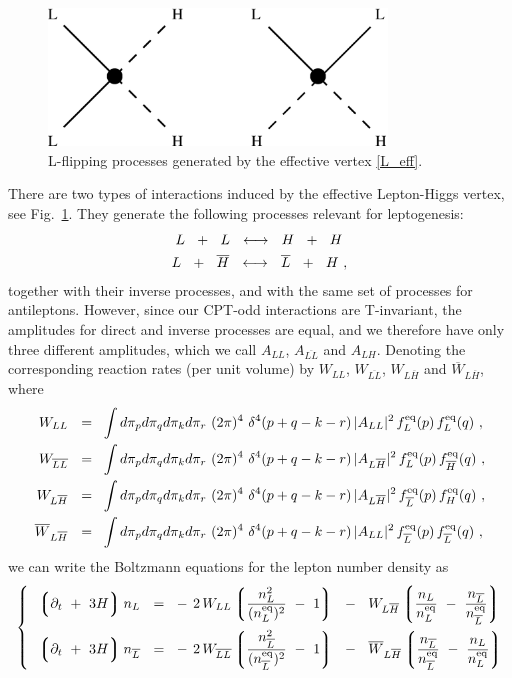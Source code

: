 \documentclass[12pt]{revtex4}
\newcommand{\eq}{{\rm eq}}
\newcommand{\lgr}{\left\lgroup}
\newcommand{\rgr}{\right\rgroup}
\newcommand{\p}{\partial}
\newcommand{\ov}{\overline}
\begin{document}
\begin{figure}
\includegraphics[width=9cm]{lflip.eps}
\caption{L-flipping processes generated by the effective vertex \eqref{L_eff}.}
\label{lflip_fig}
\end{figure}
There are two types of interactions induced by the effective
Lepton-Higgs vertex, see Fig.~\ref{lflip_fig}.
They generate the following processes relevant for leptogenesis:
\begin{align}
\notag
	L~~+~~L ~~\longleftrightarrow~~ H~~+~~H~  \\
\notag
	L~~+~~\ov{H} ~~\longleftrightarrow~~ \ov{L}~~+~~H~,
\end{align}
together with their inverse processes, and with the same set of processes
for antileptons.
However, since our CPT-odd interactions are T-invariant, the amplitudes for
direct and inverse processes are equal, and we therefore have 
only three different amplitudes, which we call  
$ A_{LL} $, $ A_{\ov{LL}} $ and $ A_{LH} $.
Denoting the corresponding reaction rates (per unit volume) by
$ W_{LL} $, $ W_{\ov{LL}} $, $ W_{L\ov{H}} $ and $ \ov{W}_{L\ov{H}} $,
where 
\begin{align*}
	W_{LL}   ~~=~~  &
		\int d\pi_p d\pi_q d\pi_k d\pi_r ~
		(2\pi)^4~ \delta^4 ( p + q - k - r )\,
		| A_{LL} |^2\, f_L^\eq(p)\, f_L^\eq(q)~, \\
	W_{\ov{LL}}   ~~=~~  &
		\int d\pi_p d\pi_q d\pi_k d\pi_r ~
		(2\pi)^4~ \delta^4 ( p + q - k - r )\,
		| A_{L\ov{H}} |^2\, f_L^\eq(p)\, f_{\ov{H}}^\eq(q)~, \\
	W_{L\ov{H}}  ~~=~~  &
		\int d\pi_p d\pi_q d\pi_k d\pi_r ~
		(2\pi)^4~ \delta^4 ( p + q - k - r )\,
		| A_{L\ov{H}} |^2\, f_{\ov{L}}^\eq(p)\, f_H^\eq(q)~, \\
	\ov{W}_{L\ov{H}}  ~~=~~  &
		\int d\pi_p d\pi_q d\pi_k d\pi_r ~
		(2\pi)^4~ \delta^4 ( p + q - k - r )\,
		| A_{LL} |^2\, f_{\ov{L}}^\eq(p)\, f_{\ov{L}}^\eq(q)~,
\end{align*}
	we can write the Boltzmann equations for the lepton number density
	as
\begin{equation}
\label{lepton_sys}
\left\{~~
\begin{split}
	\lgr \p_t ~+~ 3H \rgr 
		n_L ~~=~~ &
	-\, 2\, W_{LL} \lgr \frac{n_L^2}{(n_L^\eq)^2} ~-~ 1 \rgr
	~~-~~
	W_{L\ov{H}} \lgr \frac{n_L}{n_L^\eq} ~-~ 
			\frac{n_{\ov{L}}}{n_{\ov{L}}^\eq} \rgr  \\
	\lgr \p_t ~+~ 3H \rgr 
		n_{\ov{L}} ~~=~~ &
	-\, 2\, W_{\ov{LL}} \lgr 
		\frac{n_{\ov{L}}^2}{(n_{\ov{L}}^\eq)^2} ~-~ 1 \rgr
	~~-~~
	\ov{W}_{L\ov{H}} \lgr \frac{n_{\ov{L}}}{n_{\ov{L}}^\eq} ~-~ 
			\frac{n_L}{n_L^\eq} \rgr  \\
\end{split}
\right.
\end{equation}
\end{document}
